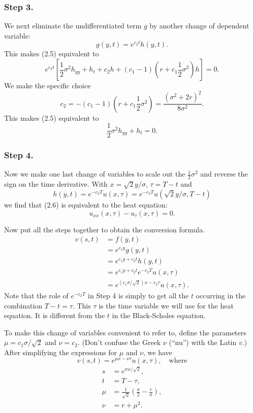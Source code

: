 \subsubsection*{Step 3.}
We next eliminate the undifferentiated term \(g\) by another change of dependent variable:
\[
g(y,t) = e^{c_2 t} h(y,t).
\]
This makes (2.5) equivalent to
\[
e^{c_2 t} \left[ \frac{1}{2}\sigma^2 h_{yy} + h_t + c_2 h + (c_1 - 1)(r + c_1 \frac{1}{2}\sigma^2) h \right] = 0.
\]
We make the specific choice
\[
c_2 = -(c_1 - 1)(r + c_1 \frac{1}{2}\sigma^2) = \frac{(\sigma^2 + 2r)^2}{8\sigma^2}.
\]
This makes (2.5) equivalent to
\[
\frac{1}{2}\sigma^2 h_{yy} + h_t = 0. \tag{2.6}
\]

\subsubsection*{Step 4.}
Now we make one last change of variables to scale out the \(\frac{1}{2}\sigma^2\) and reverse the sign on the time derivative. With \(x = \sqrt{2} y / \sigma\), \(\tau = T - t\) and
\[
h(y,t) = e^{-c_2 T} u(x,\tau) = e^{-c_2 T} u(\sqrt{2} y / \sigma, T - t)
\]
we find that (2.6) is equivalent to the heat equation:
\[
u_{xx}(x,\tau) - u_{\tau}(x,\tau) = 0. \tag{2.7}
\]

Now put all the steps together to obtain the conversion formula.
\begin{align*}
v(s,t) &= f(y,t) \\
&= e^{c_1 y} g(y,t) \\
&= e^{c_1 y + c_2 t} h(y,t) \\
&= e^{c_1 y + c_2 t} e^{-c_2 T} u(x,\tau) \\
&= e^{(c_1 \sigma / \sqrt{2}) x - c_2 \tau} u(x,\tau).
\end{align*}
Note that the role of \(e^{-c_2 T}\) in Step 4 is simply to get all the \(t\) occurring in the combination \(T - t = \tau\). This \(\tau\) is the time variable we will use for the heat equation. It is different from the \(t\) in the Black-Scholes equation.

To make this change of variables convenient to refer to, define the parameters \(\mu = c_1 \sigma / \sqrt{2}\) and \(\nu = c_2\). (Don't confuse the Greek \(\nu\) (``nu'') with the Latin \(v\).) After simplifying the expressions for \(\mu\) and \(\nu\), we have
\begin{equation*}
v(s,t) = e^{\mu x - \nu \tau} u(x,\tau), \quad \text{where} \tag{2.8}
\end{equation*}
\begin{align*}
s &= e^{\sigma x / \sqrt{2}}, \\
t &= T - \tau, \\
\mu &= \frac{1}{\sqrt{2}} \left( \frac{\sigma}{2} - \frac{r}{\sigma} \right), \\
\nu &= r + \mu^2.
\end{align*}

